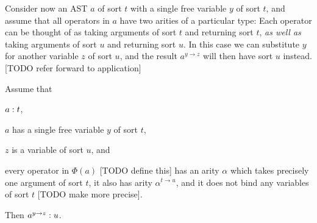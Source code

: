 \documentclass[a4paper, 11pt, article, danish, oneside]{memoir}
\begin{document}
Consider now an AST $a$ of sort $t$ with a single free variable $y$ of sort $t$, and assume that all operators in $a$ have two arities of a particular type: Each operator can be thought of as taking arguments of sort $t$ and returning sort $t$, \emph{as well as} taking arguments of sort $u$ and returning sort $u$. In this case we can substitute $y$ for another variable $z$ of sort $u$, and the result $a^{y \to z}$ will then have sort $u$ instead. [TODO refer forward to application]

\newcommand{\allops}[1]{\Phi(#1)}

\begin{lemma}
    Assume that
    \begin{enumlem}
        \item $a : t$,
        
        \item $a$ has a single free variable $y$ of sort $t$,

        \item $z$ is a variable of sort $u$, and

        \item every operator in $\allops{a}$ [TODO define this] has an arity $\alpha$ which takes precisely one argument of sort $t$, it also has arity $\alpha^{t \to u}$, and it does not bind any variables of sort $t$ [TODO make more precise].
        
    \end{enumlem}
    Then $a^{y \to z} : u$.
\end{lemma}
\end{document}
